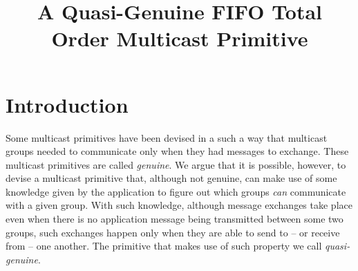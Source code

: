 \documentclass[times, 10pt]{article}
\begin{document}
\newcommand{\mv}[1]{\ensuremath{\operatorname{\mathit{#1}}}}
\newcommand{\bc}[1]{\textcolor{dark}{#1}}
\newtheorem{lems}{Lemma}
\newtheorem{props}{Proposition}
\newtheorem{thms}{Theorem}
\newtheorem{defs}{Definition}
\newtheorem{obs}{Observation}

\newcommand{\code}[1]{\texttt{\small{\textbf{#1}}}}

\newcommand{\blankline}{\vspace{4 mm}}
\newcommand{\cms}{\mbox{QGFTO-Mcast}}
\newcommand{\cmsend}[1]{\mbox{\cms({#1})}}
\newcommand{\tconsm}{T_{cons}}
\newcommand{\tcons}{\mbox{$\tconsm$}}
\newcommand{\opt}{\mbox{OPT-Deliver}}
\newcommand{\cons}{\mbox{QGFTO-Deliver}}
\newcommand{\rmc}{\mbox{FR-MCast}}
\newcommand{\rmd}{\mbox{FR-Deliver}}
\newcommand{\optdel}[1]{\mbox{\opt({#1})}}
\newcommand{\consdel}[1]{\mbox{\cons({#1})}}
\newcommand{\rmcast}[2]{\mbox{\rmc({#1},{#2})}}
\newcommand{\rmdel}[1]{\mbox{\rmd({#1})}}


\title{A Quasi-Genuine FIFO Total Order Multicast Primitive}


\maketitle

\begin{abstract}


\end{abstract}

\section{Introduction}
\label{sec:intro}

Some multicast primitives have been devised in a such a way that multicast groups needed to communicate only when they had messages to exchange. These multicast primitives are called \emph{genuine}. We argue that it is possible, however, to devise a multicast primitive that, although not genuine, can make use of some knowledge given by the application to figure out which groups \emph{can} communicate with a given group. With such knowledge, although message exchanges take place even when there is no application message being transmitted between some two groups, such exchanges happen only when they are able to send to -- or receive from -- one another. The primitive that makes use of such property we call \emph{quasi-genuine}. 
\end{document}
